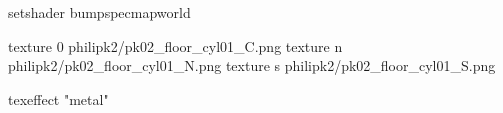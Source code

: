 setshader bumpspecmapworld

texture 0 philipk2/pk02_floor_cyl01_C.png
texture n philipk2/pk02_floor_cyl01_N.png
texture s philipk2/pk02_floor_cyl01_S.png

texeffect "metal"
